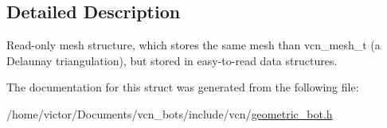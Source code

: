 \subsection{Detailed Description}
Read-\/only mesh structure, which stores the same mesh than vcn\+\_\+mesh\+\_\+t (a Delaunay triangulation), but stored in easy-\/to-\/read data structures. 

The documentation for this struct was generated from the following file\+:\begin{DoxyCompactItemize}
\item 
/home/victor/\+Documents/vcn\+\_\+bots/include/vcn/\hyperlink{geometric__bot_8h}{geometric\+\_\+bot.\+h}\end{DoxyCompactItemize}
